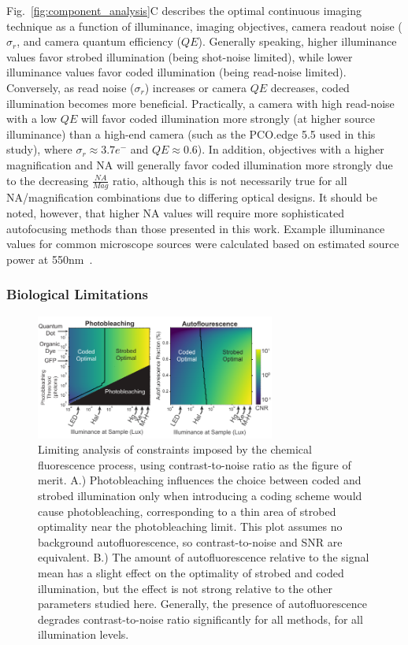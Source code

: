 Fig.~\ref{fig:component_analysis}C describes the optimal continuous imaging technique as a function of illuminance, imaging objectives, camera readout noise ($\sigma_r$, and camera quantum efficiency ($QE$). Generally speaking, higher illuminance values favor strobed illumination (being shot-noise limited), while lower illuminance values favor coded illumination (being read-noise limited). Conversely, as read noise ($\sigma_r$) increases or camera $QE$ decreases, coded illumination becomes more beneficial. Practically, a camera with high read-noise with a low $QE$ will favor coded illumination more strongly (at higher source illuminance) than a high-end camera (such as the PCO.edge 5.5 used in this study), where $\sigma_r \approx 3.7 e^-$ and $QE \approx 0.6$). In addition, objectives with a higher magnification and NA will generally favor coded illumination more strongly due to the decreasing $\frac{NA}{Mag}$ ratio, although this is not necessarily true for all NA/magnification combinations due to differing optical designs. It should be noted, however, that higher NA values will require more sophisticated autofocusing methods than those presented in this work. Example illuminance values for common microscope sources were calculated based on estimated source power at 550nm~\cite{illumpower}.

\subsubsection{Biological Limitations}

\begin{figure}
  \centering
    \includegraphics[width=0.7\textwidth]{figures/fig_highthroughput_fluorescence_analysis.pdf}
      \caption{\label{fig:fluorescence_analysis} Limiting analysis of constraints imposed by the chemical fluorescence process, using contrast-to-noise ratio as the figure of merit. A.) Photobleaching influences the choice between coded and strobed illumination only when introducing a coding scheme would cause photobleaching, corresponding to a thin area of strobed optimality near the photobleaching limit. This plot assumes no background autofluorescence, so contrast-to-noise and SNR are equivalent. B.) The amount of autofluorescence relative to the signal mean has a slight effect on the optimality of strobed and coded illumination, but the effect is not strong relative to the other parameters studied here. Generally, the presence of autofluorescence degrades contrast-to-noise ratio significantly for all methods, for all illumination levels.}
\end{figure}

